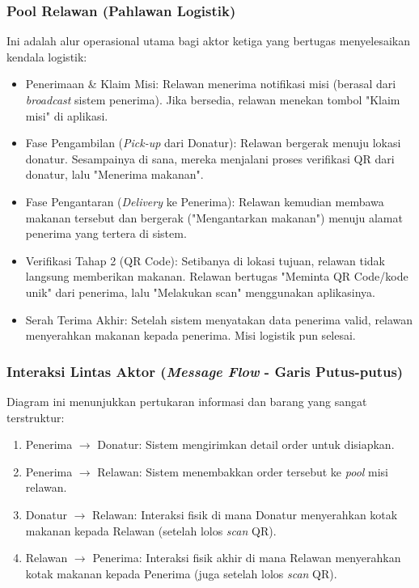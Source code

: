 \subsubsection{Pool Relawan (Pahlawan Logistik)}
Ini adalah alur operasional utama bagi aktor ketiga yang bertugas menyelesaikan kendala logistik:
\begin{itemize}
    \item Penerimaan \& Klaim Misi: Relawan menerima notifikasi misi (berasal dari \textit{broadcast} sistem penerima). Jika bersedia, relawan menekan tombol "Klaim misi" di aplikasi.
    \item Fase Pengambilan (\textit{Pick-up} dari Donatur): Relawan bergerak menuju lokasi donatur. Sesampainya di sana, mereka menjalani proses verifikasi QR dari donatur, lalu "Menerima makanan".
    \item Fase Pengantaran (\textit{Delivery} ke Penerima): Relawan kemudian membawa makanan tersebut dan bergerak ("Mengantarkan makanan") menuju alamat penerima yang tertera di sistem.
    \item Verifikasi Tahap 2 (QR Code): Setibanya di lokasi tujuan, relawan tidak langsung memberikan makanan. Relawan bertugas "Meminta QR Code/kode unik" dari penerima, lalu "Melakukan scan" menggunakan aplikasinya.
    \item Serah Terima Akhir: Setelah sistem menyatakan data penerima valid, relawan menyerahkan makanan kepada penerima. Misi logistik pun selesai.
\end{itemize}

\subsubsection{Interaksi Lintas Aktor (\textit{Message Flow} - Garis Putus-putus)}
Diagram ini menunjukkan pertukaran informasi dan barang yang sangat terstruktur:
\begin{enumerate}
    \item Penerima $\rightarrow$ Donatur: Sistem mengirimkan detail order untuk disiapkan.
    \item Penerima $\rightarrow$ Relawan: Sistem menembakkan order tersebut ke \textit{pool} misi relawan.
    \item Donatur $\rightarrow$ Relawan: Interaksi fisik di mana Donatur menyerahkan kotak makanan kepada Relawan (setelah lolos \textit{scan} QR).
    \item Relawan $\rightarrow$ Penerima: Interaksi fisik akhir di mana Relawan menyerahkan kotak makanan kepada Penerima (juga setelah lolos \textit{scan} QR).
\end{enumerate}

